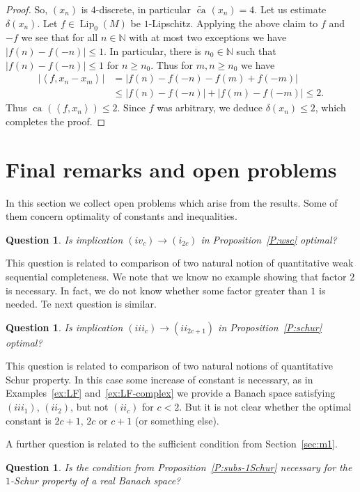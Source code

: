 \documentclass{amsart}
\numberwithin{equation}{section}
\newtheorem{ques}[thm]{Question}
\theoremstyle{definition}
\def\en{\mathbb N}
\def \Lip {\operatorname{Lip}}
\def\ip#1#2{\left\langle#1,#2\right\rangle}
\def\de#1{\delta\left(#1\right)}
\newcommand{\ca}[2][]{\operatorname{ca}_{#1}\left(#2\right)}
\newcommand{\wca}[2][]{\widetilde{\operatorname{ca}}_{#1}\left(#2\right)}
\newcommand{\abs}[1]{\left|#1\right|}
\begin{document}
\begin{proof}
So, $(x_n)$ is $4$-discrete, in particular $\wca{x_n}=4$. Let us estimate $\de{x_n}$. Let $f\in \Lip_0(M)$ be $1$-Lipschitz. Applying the above claim to $f$ and $-f$ we see that for all $n\in\en$ with at most two exceptions we have $\abs{f(n)-f(-n)}\le 1$. In particular, there is $n_0\in\en$ such that $\abs{f(n)-f(-n)}\le 1$ for $n\ge n_0$.
Thus for $m,n\ge n_0$ we have
$$\begin{aligned}    
\abs{\ip{f}{x_n-x_m}}&=\abs{f(n)-f(-n)-f(m)+f(-m)}\\&\le\abs{f(n)-f(-n)}+\abs{f(m)-f(-m)}\le 2.\end{aligned}$$
Thus $\ca{\ip{f}{x_n}}\le 2$. Since $f$ was arbitrary, we deduce $\de{x_n}\le2$, which completes the proof.    
\end{proof}

\section{Final remarks and open problems}

In this section we collect open problems which arise from the results. Some of them concern optimality of constants and inequalities.

\begin{ques}
    Is implication $(iv_c)\to(i_{2c})$ in Proposition~\ref{P:wsc} optimal?
\end{ques}

This question is related to comparison of two natural notion of quantitative weak sequential completeness.
We note that we know no example showing that factor $2$ is necessary. In fact, we do not know whether some factor greater than $1$ is needed. Te next question is similar.

\begin{ques}
    Is implication $(iii_c)\to(ii_{2c+1})$ in Proposition~\ref{P:schur} optimal?
\end{ques}

This question is related to comparison of two natural notions of quantitative Schur property. In this case some increase of constant is necessary, as in Examples~\ref{ex:LF} and~\ref{ex:LF-complex} we provide a Banach space satisfying $(iii_1)$, $(ii_2)$, but not $(ii_c)$ for $c<2$. But it is not clear whether the optimal constant is $2c+1$, $2c$ or $c+1$ (or something else).

A further question is related to the sufficient condition from Section~\ref{sec:m1}.

\begin{ques}
    Is the condition from Proposition~\ref{P:subs-1Schur} necessary for the $1$-Schur property of a real Banach space?
\end{ques}
\end{document}
